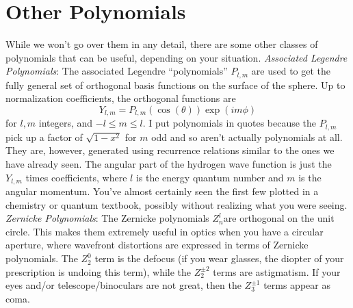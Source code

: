 \documentclass[12]{article}
\begin{document}
\section{Other Polynomials}
While we won't go over them in any detail, there are some other
classes of polynomials that can be useful, depending on your
situation.  
\vskip 0.05in
\noindent
\textit{Associated Legendre Polynomials}:  The associated Legendre
``polynomials'' $P_{l,m}$ are used to get the fully general set of
orthogonal basis functions on the surface of the sphere.  Up to
normalization coefficients, the orthogonal functions are 
$$Y_{l,m}= P_{l,m}(\cos(\theta))\exp(im\phi)$$
for $l,m$ integers, and $-l \leq m \leq l$.  I put polynomials in
quotes because the $P_{l,m}$ pick up a factor of $\sqrt{1-x^2}$ for
$m$ odd and so aren't actually polynomials at all.  They are, however,
generated using recurrence relations similar to the ones we have
already seen.  The angular part of the hydrogen wave function is just
the $Y_{l,m}$ times coefficients, where $l$ is the energy quantum
number and $m$ is the angular momentum.  You've almost certainly seen
the first few plotted in a chemistry or quantum textbook, possibly
without realizing what you were seeing.
\vskip 0.05in
\noindent
\textit{Zernicke Polynomials}:  The Zernicke polynomials $Z_n^l$are
orthogonal on the unit circle.  This makes them extremely useful in
optics when you have a circular aperture, where wavefront distortions
are expressed in terms of Zernicke polynomials.  The $Z_2^0$ term is
the defocus (if you wear glasses, the diopter of your prescription is
undoing this term), while the $Z_2^{\pm2}$ terms are astigmatism.  If
your eyes and/or telescope/binoculars are not great, then the
$Z_3^{\pm 1}$ terms appear as coma.  
\end{document}
